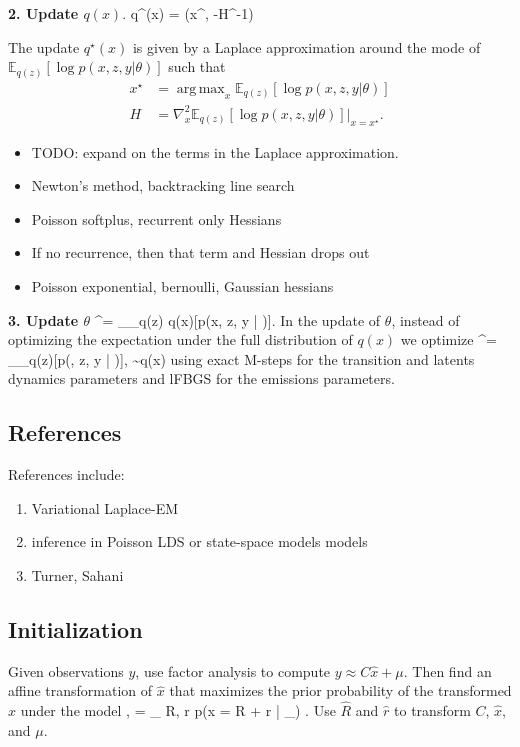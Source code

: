 \documentclass{article}
\DeclareMathOperator*{\argmax}{arg\,max}
\begin{document}
\textbf{2. Update $q(x)$}. 
\be
q^\star(x)  = (x^\star, -H^{-1}) 
\ee


The update $q^\star(x)$ is given by a Laplace approximation around the mode of $\mathbb{E}_{q(z)}[\log p(x, z, y | \theta)]$ such that 
\begin{align*}
x^\star &= \argmax_x \mathbb{E}_{q(z)}[\log p(x, z, y | \theta)] \\
H &= \nabla_x^2 \mathbb{E}_{q(z)}[\log p(x, z, y | \theta)] \bigg|_{x = x^\star}.
\end{align*}
\begin{itemize}
\item TODO: expand on the terms in the Laplace approximation. 
\item Newton's method, backtracking line search
\item Poisson softplus, recurrent only Hessians 
\item If no recurrence, then that term and Hessian drops out
\item Poisson exponential, bernoulli, Gaussian hessians 
\end{itemize}

\textbf{3. Update $\theta$}
\be
\theta^\star = \argmax_\theta {}_{q(z) q(x)}[\log p(x, z, y | \theta)].
\ee
In the update of $\theta$, instead of optimizing the expectation under the full distribution of $q(x)$ we optimize
\be
\theta^\star = \argmax_\theta {}_{q(z)}[\log p(, z, y | \theta)], \quad {} \sim q(x)
\ee
using exact M-steps for the transition and latents dynamics parameters and lFBGS for the emissions parameters. 


\subsection{References}
References include: 
\begin{enumerate}
\item Variational Laplace-EM \cite{wang2013variational}
\item inference in Poisson LDS or state-space models models \cite{macke2011empirical,paninski2010new, macke2015estimating, archer2015black}
\item Turner, Sahani \cite{turner2011two}
\end{enumerate}

\subsection{Initialization}
Given observations $y$, use factor analysis to compute $y \approx C \hat{x} + \mu$. Then find an affine transformation of $\hat{x}$ that maximizes the prior probability of the transformed $\hat{x}$ under the model 
\be
{},  = \argmax_{ R, r } \log p(x = R  + r | \theta_) .
\ee
Use $\hat{R}$ and $\hat{r}$ to transform $C$, $\hat{x}$, and $\mu$.
\end{document}
